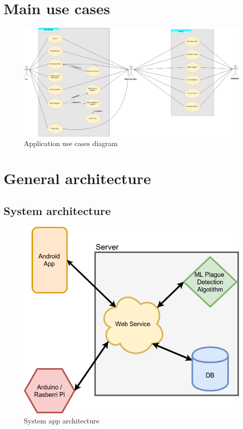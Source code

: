 \documentclass[11pt,a4paper]{article}
\begin{document}
\newpage

\section{Main use cases}
\begin{figure}[hbtp]
\centering
\includegraphics[scale=0.3195,angle=90,origin=c]{figures/usecasediagram.png}
\caption{Application use cases diagram}
\end{figure}

\newpage

\section{General architecture}
\subsection{System architecture}
\begin{figure}[hbtp]
\centering
\includegraphics[scale=0.6]{figures/AppArchitecture.png}
\caption{System app architecture}
\end{figure}
\end{document}
